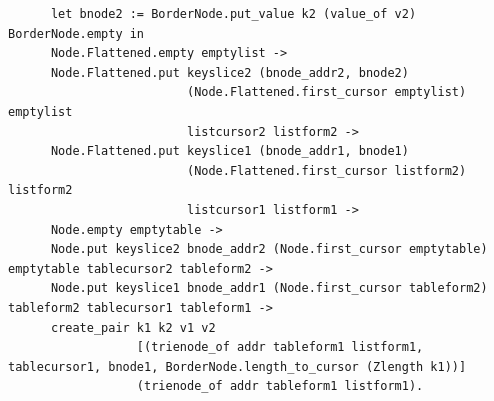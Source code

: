 \documentclass[runningheads]{llncs}
\begin{document}
\begin{verbatim}
      let bnode2 := BorderNode.put_value k2 (value_of v2) BorderNode.empty in
      Node.Flattened.empty emptylist ->
      Node.Flattened.put keyslice2 (bnode_addr2, bnode2)
                         (Node.Flattened.first_cursor emptylist) emptylist
                         listcursor2 listform2 ->
      Node.Flattened.put keyslice1 (bnode_addr1, bnode1)
                         (Node.Flattened.first_cursor listform2) listform2
                         listcursor1 listform1 ->
      Node.empty emptytable ->
      Node.put keyslice2 bnode_addr2 (Node.first_cursor emptytable) emptytable tablecursor2 tableform2 ->
      Node.put keyslice1 bnode_addr1 (Node.first_cursor tableform2) tableform2 tablecursor1 tableform1 ->
      create_pair k1 k2 v1 v2
                  [(trienode_of addr tableform1 listform1, tablecursor1, bnode1, BorderNode.length_to_cursor (Zlength k1))]
                  (trienode_of addr tableform1 listform1).


\end{verbatim}
\end{document}
